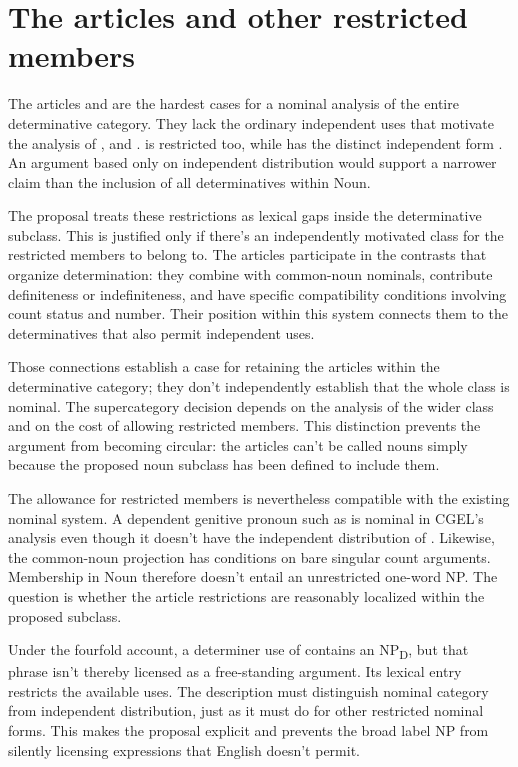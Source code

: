\documentclass[12pt]{article}
\begin{document}
\section{The articles and other restricted members}\label{sec:articles}

The articles  and  are the hardest cases for a nominal analysis of the entire determinative category. They lack the ordinary independent uses that motivate the analysis of ,  and .  is restricted too, while  has the distinct independent form  \citep[371--372, 410--411]{huddleston2002}. An argument based only on independent distribution would support a narrower claim than the inclusion of all determinatives within Noun.

The proposal treats these restrictions as lexical gaps inside the determinative subclass. This is justified only if there's an independently motivated class for the restricted members to belong to. The articles participate in the contrasts that organize determination: they combine with common-noun nominals, contribute definiteness or indefiniteness, and have specific compatibility conditions involving count status and number. Their position within this system connects them to the determinatives that also permit independent uses.

Those connections establish a case for retaining the articles within the determinative category; they don't independently establish that the whole class is nominal. The supercategory decision depends on the analysis of the wider class and on the cost of allowing restricted members. This distinction prevents the argument from becoming circular: the articles can't be called nouns simply because the proposed noun subclass has been defined to include them.

The allowance for restricted members is nevertheless compatible with the existing nominal system. A dependent genitive pronoun such as  is nominal in CGEL's analysis even though it doesn't have the independent distribution of  \citep[470--471]{huddleston2002}. Likewise, the common-noun projection has conditions on bare singular count arguments. Membership in Noun therefore doesn't entail an unrestricted one-word NP. The question is whether the article restrictions are reasonably localized within the proposed subclass.

Under the fourfold account, a determiner use of  contains an NP\textsubscript{D}, but that phrase isn't thereby licensed as a free-standing argument. Its lexical entry restricts the available uses. The description must distinguish nominal category from independent distribution, just as it must do for other restricted nominal forms. This makes the proposal explicit and prevents the broad label NP from silently licensing expressions that English doesn't permit.
\end{document}
